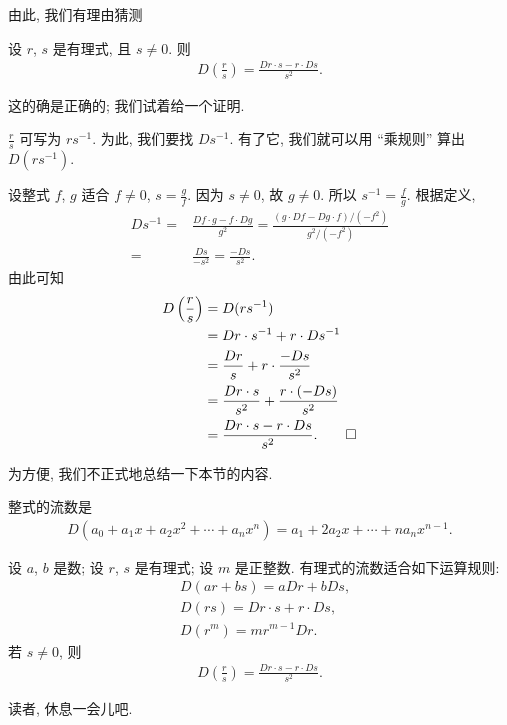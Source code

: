 由此, 我们有理由猜测
\begin{proposition}
    设 $r$, $s$ 是有理式, 且 $s \neq 0$. 则
    \begin{align*}
        D \left( \frac{r}{s} \right) = \frac{Dr \cdot s - r \cdot Ds}{s^2}.
    \end{align*}
\end{proposition}

这的确是正确的; 我们试着给一个证明.
\begin{pf}
    $\frac{r}{s}$ 可写为 $rs^{-1}$. 为此, 我们要找 $Ds^{-1}$. 有了它, 我们就可以用 ``乘规则'' 算出 $D(rs^{-1})$.

    设整式 $f$, $g$ 适合 $f \neq 0$, $s = \frac{g}{f}$. 因为 $s \neq 0$, 故 $g \neq 0$. 所以 $s^{-1} = \frac{f}{g}$. 根据定义,
    \begin{align*}
        Ds^{-1}
        = {} & \frac{Df \cdot g - f \cdot Dg}{g^2} = \frac{(g \cdot Df - Dg \cdot f)/(-f^2)}{g^2/(-f^2)} \\
        = {} & \frac{Ds}{-s^2} = \frac{-Ds}{s^2}.
    \end{align*}
    由此可知
    \begin{align*}
        D \left( \frac{r}{s} \right)
        = {} & D(rs^{-1})                                         \\
        = {} & Dr \cdot s^{-1} + r \cdot Ds^{-1}                  \\
        = {} & \frac{Dr}{s} + r \cdot \frac{-Ds}{s^2}             \\
        = {} & \frac{Dr \cdot s}{s^2} + \frac{r \cdot (-Ds)}{s^2} \\
        = {} & \frac{Dr \cdot s - r \cdot Ds}{s^2}. \qedhere
    \end{align*}
\end{pf}

为方便, 我们不正式地总结一下本节的内容.
\begin{proposition}
    整式的流数是
    \begin{align*}
        D(a_0 + a_1 x + a_2 x^2 + \cdots + a_n x^n) = a_1 + 2a_2 x + \cdots + na_n x^{n-1}.
    \end{align*}

    设 $a$, $b$ 是数; 设 $r$, $s$ 是有理式; 设 $m$ 是正整数. 有理式的流数适合如下运算规则:
    \begin{align*}
         & D(ar + bs) = aDr + bDs,          \\
         & D(rs) = Dr \cdot s + r \cdot Ds, \\
         & D(r^m) = mr^{m-1} Dr.
    \end{align*}
    若 $s \neq 0$, 则
    \begin{align*}
        D \left( \frac{r}{s} \right) = \frac{Dr \cdot s - r \cdot Ds}{s^2}.
    \end{align*}
\end{proposition}

读者, 休息一会儿吧.
